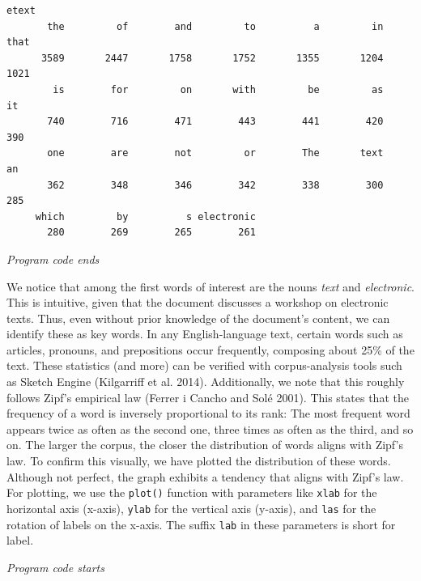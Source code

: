 \begin{verbatim}
etext
       the         of        and         to          a         in       that 
      3589       2447       1758       1752       1355       1204       1021 
        is        for         on       with         be         as         it 
       740        716        471        443        441        420        390 
       one        are        not         or        The       text         an 
       362        348        346        342        338        300        285 
     which         by          s electronic 
       280        269        265        261 
\end{verbatim}

\emph{Program code ends}

We notice that among the first words of interest are the nouns
\emph{text} and \emph{electronic}. This is intuitive, given that the
document discusses a workshop on electronic texts. Thus, even without
prior knowledge of the document's content, we can identify these as key
words. In any English-language text, certain words such as articles, pronouns, and prepositions occur frequently, composing about 25\% of
the text. These statistics (and more) can be verified with corpus-analysis tools such as Sketch Engine (Kilgarriff et al. 2014).
Additionally, we note that this roughly follows Zipf's empirical law (Ferrer i Cancho and
Solé 2001). This states that the
frequency of a word is inversely proportional to its rank: The most
frequent word appears twice as often as the second one, three times as
often as the third, and so on. The larger the corpus, the closer the
distribution of words aligns with Zipf's law. To  confirm
this visually, we have plotted the distribution of these words. Although not perfect, the
graph exhibits a tendency that aligns with Zipf's law. For plotting, we
use the \texttt{plot()} function with parameters like \texttt{xlab} for
the horizontal axis (x-axis), \texttt{ylab} for the vertical axis
(y-axis), and \texttt{las} for the rotation of labels on the x-axis. The
suffix \texttt{lab} in these parameters is short for label.

\emph{Program code starts}

\begin{Shaded}
\begin{Highlighting}[]
\NormalTok{(sorted\_etext[}\SpecialCharTok{:}\NormalTok{],}
      \NormalTok{,                }
      \NormalTok{,}
      \NormalTok{,}
      \NormalTok{, }
      \NormalTok{,            }
\NormalTok{     )}
\end{Highlighting}
\end{Shaded}

